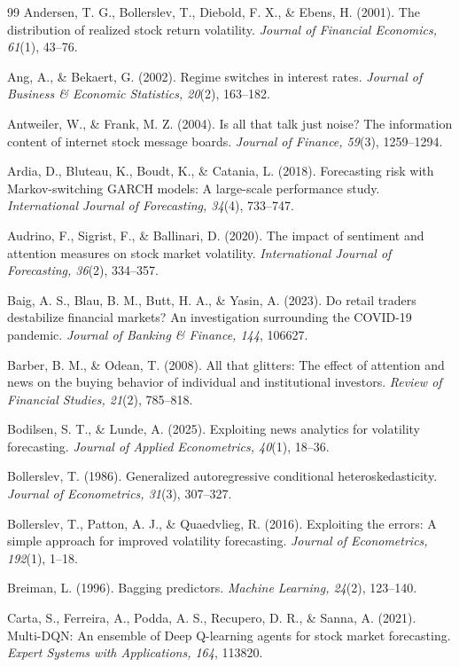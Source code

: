 \documentclass[review]{elsarticle}
\begin{document}
\begin{thebibliography}{99}
Andersen, T. G., Bollerslev, T., Diebold, F. X., \& Ebens, H. (2001). The distribution of realized stock return volatility. \emph{Journal of Financial Economics, 61}(1), 43--76.

Ang, A., \& Bekaert, G. (2002). Regime switches in interest rates. \emph{Journal of Business \& Economic Statistics, 20}(2), 163--182.

Antweiler, W., \& Frank, M. Z. (2004). Is all that talk just noise? The information content of internet stock message boards. \emph{Journal of Finance, 59}(3), 1259--1294.

Ardia, D., Bluteau, K., Boudt, K., \& Catania, L. (2018). Forecasting risk with Markov-switching GARCH models: A large-scale performance study. \emph{International Journal of Forecasting, 34}(4), 733--747.

Audrino, F., Sigrist, F., \& Ballinari, D. (2020). The impact of sentiment and attention measures on stock market volatility. \emph{International Journal of Forecasting, 36}(2), 334--357.

Baig, A. S., Blau, B. M., Butt, H. A., \& Yasin, A. (2023). Do retail traders destabilize financial markets? An investigation surrounding the COVID-19 pandemic. \emph{Journal of Banking \& Finance, 144}, 106627.

Barber, B. M., \& Odean, T. (2008). All that glitters: The effect of attention and news on the buying behavior of individual and institutional investors. \emph{Review of Financial Studies, 21}(2), 785--818.

Bodilsen, S. T., \& Lunde, A. (2025). Exploiting news analytics for volatility forecasting. \emph{Journal of Applied Econometrics, 40}(1), 18--36.

Bollerslev, T. (1986). Generalized autoregressive conditional heteroskedasticity. \emph{Journal of Econometrics, 31}(3), 307--327.

Bollerslev, T., Patton, A. J., \& Quaedvlieg, R. (2016). Exploiting the errors: A simple approach for improved volatility forecasting. \emph{Journal of Econometrics, 192}(1), 1--18.

Breiman, L. (1996). Bagging predictors. \emph{Machine Learning, 24}(2), 123--140.

Carta, S., Ferreira, A., Podda, A. S., Recupero, D. R., \& Sanna, A. (2021). Multi-DQN: An ensemble of Deep Q-learning agents for stock market forecasting. \emph{Expert Systems with Applications, 164}, 113820.


\end{thebibliography}
\end{document}
